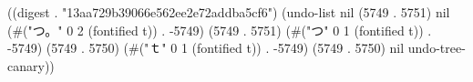 
((digest . "13aa729b39066e562ee2e72addba5cf6") (undo-list nil (5749 . 5751) nil (#("つ。" 0 2 (fontified t)) . -5749) (5749 . 5751) (#("つ" 0 1 (fontified t)) . -5749) (5749 . 5750) (#("ｔ" 0 1 (fontified t)) . -5749) (5749 . 5750) nil undo-tree-canary))
